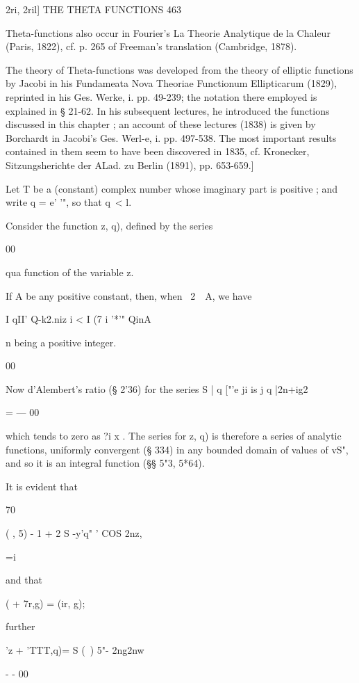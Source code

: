 2ri, 2ril] THE THETA FUNCTIONS 463

Theta-functions also occur in Fourier's La Theorie Analytique de la
Chaleur (Paris, 1822), cf. p. 265 of Freeman's translation (Cambridge,
1878).

The theory of Theta-functions was developed from the theory of
elliptic functions by Jacobi in his Fundameata Nova Theoriae
Functionum Ellipticarum (1829), reprinted in his Ges. Werke, i. pp.
49-239; the notation there employed is explained in § 21-62. In his
subsequent lectures, he introduced the functions discussed in this
chapter ; an account of these lectures (1838) is given by Borchardt in
Jacobi's Ges. Werl-e, i. pp. 497-538. The most important results
contained in them seem to have been discovered in 1835, cf. Kronecker,
Sitzungsherichte der ALad. zu Berlin (1891), pp. 653-659.]

Let T be a (constant) complex number whose imaginary part is positive
; and write q = e' '", so that q\ < l.

Consider the function z, q), defined by the series

00

qua function of the variable z.

If A be any positive constant, then, when \ 2\ \ A, we have

I qII' Q-k2.niz i < I (7 i '*'" QinA

n being a positive integer.

00

Now d'Alembert's ratio (§ 2'36) for the series S | q ["'e ji is j q
|2n+ig2

  = — 00

which tends to zero as ?i x . The series for z, q) is therefore a
series of analytic functions, uniformly convergent (§ 334) in any
bounded domain of values of vS", and so it is an integral function (§§
5"3, 5*64).

It is evident that

 70

  ( , 5) - 1 + 2 S -y'q" ' COS 2nz,





 =i


and that


 ( + 7r,g) = (ir, g);


further


'z + 'TTT,q)= S (\ ) 5"- 2ng2nw

 - - 00



